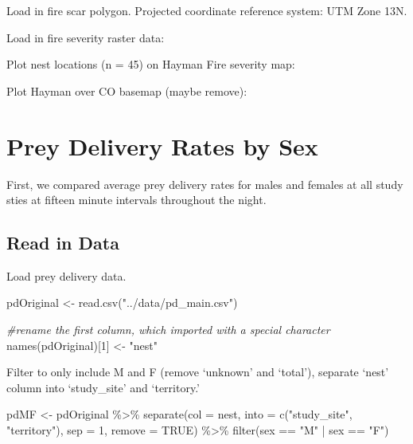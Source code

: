 \documentclass[
]{article}
\newenvironment{Shaded}{\begin{snugshade}}{\end{snugshade}}
\newcommand{\AttributeTok}[1]{\textcolor[rgb]{0.77,0.63,0.00}{#1}}
\newcommand{\CommentTok}[1]{\textcolor[rgb]{0.56,0.35,0.01}{\textit{#1}}}
\newcommand{\ConstantTok}[1]{\textcolor[rgb]{0.00,0.00,0.00}{#1}}
\newcommand{\DecValTok}[1]{\textcolor[rgb]{0.00,0.00,0.81}{#1}}
\newcommand{\FunctionTok}[1]{\textcolor[rgb]{0.00,0.00,0.00}{#1}}
\newcommand{\NormalTok}[1]{#1}
\newcommand{\OtherTok}[1]{\textcolor[rgb]{0.56,0.35,0.01}{#1}}
\newcommand{\SpecialCharTok}[1]{\textcolor[rgb]{0.00,0.00,0.00}{#1}}
\newcommand{\StringTok}[1]{\textcolor[rgb]{0.31,0.60,0.02}{#1}}
\begin{document}
Load in fire scar polygon. Projected coordinate reference system: UTM
Zone 13N.

Load in fire severity raster data:

Plot nest locations (n = 45) on Hayman Fire severity map:

Plot Hayman over CO basemap (maybe remove):

\hypertarget{prey-delivery-rates-by-sex}{%
\section{Prey Delivery Rates by Sex}\label{prey-delivery-rates-by-sex}}

First, we compared average prey delivery rates for males and females at
all study sties at fifteen minute intervals throughout the night.

\hypertarget{read-in-data}{%
\subsection{Read in Data}\label{read-in-data}}

Load prey delivery data.

\begin{Shaded}
\begin{Highlighting}[]
\NormalTok{pdOriginal }\OtherTok{\textless{}{-}} \FunctionTok{read.csv}\NormalTok{(}\StringTok{"../data/pd\_main.csv"}\NormalTok{)}

\CommentTok{\#rename the first column, which imported with a special character}
\FunctionTok{names}\NormalTok{(pdOriginal)[}\DecValTok{1}\NormalTok{] }\OtherTok{\textless{}{-}} \StringTok{"nest"}
\end{Highlighting}
\end{Shaded}

Filter to only include M and F (remove `unknown' and `total'), separate
`nest' column into `study\_site' and `territory.'

\begin{Shaded}
\begin{Highlighting}[]
\NormalTok{pdMF }\OtherTok{\textless{}{-}}\NormalTok{ pdOriginal }\SpecialCharTok{\%\textgreater{}\%}
  \FunctionTok{separate}\NormalTok{(}\AttributeTok{col =}\NormalTok{ nest, }\AttributeTok{into =} \FunctionTok{c}\NormalTok{(}\StringTok{"study\_site"}\NormalTok{, }\StringTok{"territory"}\NormalTok{), }\AttributeTok{sep =} \DecValTok{1}\NormalTok{, }\AttributeTok{remove =} \ConstantTok{TRUE}\NormalTok{) }\SpecialCharTok{\%\textgreater{}\%}
  \FunctionTok{filter}\NormalTok{(sex }\SpecialCharTok{==} \StringTok{"M"} \SpecialCharTok{|}\NormalTok{ sex }\SpecialCharTok{==} \StringTok{"F"}\NormalTok{)}
\end{Highlighting}
\end{Shaded}
\end{document}

